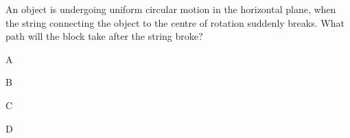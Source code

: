 \begin{checkpoint}
\begin{MCquestion}{
An object is undergoing uniform circular motion in the horizontal plane, when the string connecting the object to the centre of rotation suddenly breaks. What path will the block take after the string broke?}
\item A
\item B \correct
\item C
\item D
\end{MCquestion}
\end{checkpoint}
\vspace{-0.45cm}
